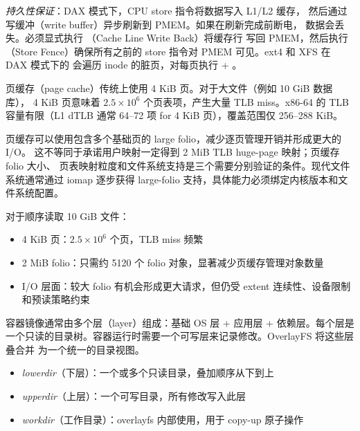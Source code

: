 \begin{filesystemlayout}
\emph{持久性保证}：DAX 模式下，CPU store 指令将数据写入 L1/L2 缓存，
然后通过写缓冲（write buffer）异步刷新到 PMEM。如果在刷新完成前断电，
数据会丢失。必须显式执行 （Cache Line Write Back）将缓存行
写回 PMEM，然后执行 （Store Fence）确保所有之前的 store
指令对 PMEM 可见。ext4 和 XFS 在 DAX 模式下的  会遍历
inode 的脏页，对每页执行  + 。


页缓存（page cache）传统上使用 4 KiB 页。对于大文件（例如 10 GiB 数据库），
4 KiB 页意味着 $2.5 \times 10^6$ 个页表项，产生大量 TLB miss。x86-64 的
TLB 容量有限（L1 dTLB 通常 64--72 项 for 4 KiB 页），覆盖范围仅 256--288 KiB。

页缓存可以使用包含多个基础页的 large folio，减少逐页管理开销并形成更大的 I/O。
这不等同于承诺用户映射一定得到 2 MiB TLB huge-page 映射；页缓存 folio 大小、
页表映射粒度和文件系统支持是三个需要分别验证的条件。现代文件系统通常通过
iomap 逐步获得 large-folio 支持，具体能力必须绑定内核版本和文件系统配置。

对于顺序读取 10 GiB 文件：
\begin{itemize}\tightlist
\item 4 KiB 页：$2.5 \times 10^6$ 个页，TLB miss 频繁
\item 2 MiB folio：只需约 5120 个 folio 对象，显著减少页缓存管理对象数量
\item I/O 层面：较大 folio 有机会形成更大请求，但仍受 extent 连续性、设备限制和预读策略约束
\end{itemize}


容器镜像通常由多个层（layer）组成：基础 OS 层 + 应用层 + 依赖层。每个层是
一个只读的目录树。容器运行时需要一个可写层来记录修改。OverlayFS 将这些层叠合并
为一个统一的目录视图。

\begin{itemize}\tightlist
\item \emph{lowerdir}（下层）：一个或多个只读目录，叠加顺序从下到上
\item \emph{upperdir}（上层）：一个可写目录，所有修改写入此层
\item \emph{workdir}（工作目录）：overlayfs 内部使用，用于 copy-up 原子操作
\end{itemize}


\end{filesystemlayout}
